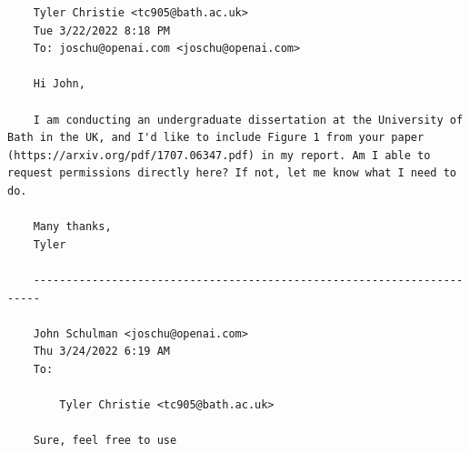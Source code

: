 \documentclass[12pt]{article}
\begin{document}
\begin{verbatim}
    Tyler Christie <tc905@bath.ac.uk>
    Tue 3/22/2022 8:18 PM
    To: joschu@openai.com <joschu@openai.com>

    Hi John,

    I am conducting an undergraduate dissertation at the University of Bath in the UK, and I'd like to include Figure 1 from your paper (https://arxiv.org/pdf/1707.06347.pdf) in my report. Am I able to request permissions directly here? If not, let me know what I need to do.

    Many thanks,
    Tyler

    -----------------------------------------------------------------------

    John Schulman <joschu@openai.com>
    Thu 3/24/2022 6:19 AM
    To:

        Tyler Christie <tc905@bath.ac.uk>
    
    Sure, feel free to use
\end{verbatim}
\end{document}
